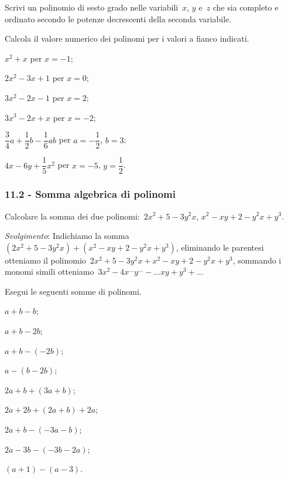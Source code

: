 \begin{multicols}{2}
\begin{esercizio}
\label{ese:11.10}
Scrivi un polinomio di sesto grado nelle variabili~$x$, $y$ e~$z$ che sia completo e ordinato secondo le
potenze decrescenti della seconda variabile.
\end{esercizio}


\begin{esercizio}
\label{ese:11.11}
Calcola il valore numerico dei polinomi per i valori a fianco indicati.

\begin{enumeratea}
\item $x^2+x$ per $x=-1$;
\item $2x^2-3x+1$ per $x=0$;
\item $3x^2-2x-1$ per $x=2$;
\item $3x^3-2x+x$ per $x=-2$;
\item $\dfrac{3}{4}a+\dfrac{1}{2}b-\dfrac{1}{6}ab$ per $a=-\dfrac{1}{2}$, $b=3$;
\item $4x-6y+\dfrac{1}{5}x^2$ per $x=-5$, $y=\dfrac{1}{2}$.
\end{enumeratea}
\end{esercizio}
\end{multicols}


\subsubsection*{11.2 - Somma algebrica di polinomi}
\begin{esercizio}
\label{ese:11.12}
Calcolare la somma dei due polinomi:~$2x^2+5−3y^2x$, $x^2−xy+2−y^2x+y^3$.

\emph{Svolgimento}: Indichiamo la somma~$(2x^2+5−3y^2x)+(x^2−xy+2−y^2x+y^3)$, eliminando le parentesi otteniamo
il polinomio~$2x^2+5−3y^2x+x^2−xy+2−y^2x+y^3$, sommando i monomi simili otteniamo~$3x^2−4x^{\ldots}y^{\ldots}-\ldots xy+y^3+\ldots$
\end{esercizio}
\begin{esercizio}
\label{ese:11.13}
 Esegui le seguenti somme di polinomi.
\begin{multicols}{3}
 \begin{enumeratea}
 \item $a+b-b$;
 \item $a+b-2b$;
 \item $a+b-(-2b)$;
 \item $a-(b-2b)$;
 \item $2a+b+(3a+b)$;
 \item $2a+2b+(2a+b)+2a$;
 \item $2a+b-(-3a-b)$;
 \item $2a-3b-(-3b-2a)$;
 \item $(a+1)-(a-3)$.
\end{enumeratea}
\end{multicols}
\end{esercizio}

